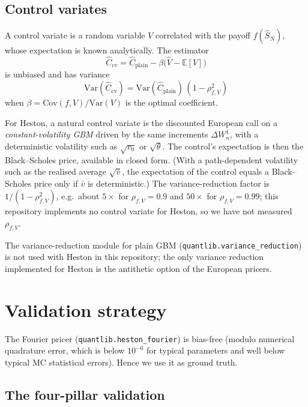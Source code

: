 \documentclass[11pt]{article}
\theoremstyle{plain}
\theoremstyle{definition}
\theoremstyle{remark}
\begin{document}
\subsection{Control variates}

A control variate is a random variable $V$ correlated with the payoff $f(\hat S_N)$, whose expectation is known analytically. The estimator
\[
    \widehat C_{\mathrm{cv}} = \widehat C_{\mathrm{plain}} - \beta\bigl(\widehat V - \mathbb{E}[V]\bigr)
\]
is unbiased and has variance
\[
    \mathrm{Var}(\widehat C_{\mathrm{cv}}) = \mathrm{Var}(\widehat C_{\mathrm{plain}})\,(1 - \rho^2_{f, V})
\]
when $\beta = \mathrm{Cov}(f, V)/\mathrm{Var}(V)$ is the optimal coefficient.

For Heston, a natural control variate is the discounted European call on a \emph{constant-volatility GBM} driven by the same increments $\Delta W^1_n$, with a deterministic volatility such as $\sqrt{v_0}$ or $\sqrt{\theta}$. The control's expectation is then the Black--Scholes price, available in closed form. (With a path-dependent volatility such as the realised average $\sqrt{\bar v}$, the expectation of the control equals a Black--Scholes price only if $\bar v$ is deterministic.) The variance-reduction factor is $1/(1 - \rho^2_{f, V})$, e.g.\ about $5\times$ for $\rho_{f,V} = 0.9$ and $50\times$ for $\rho_{f,V} = 0.99$; this repository implements no control variate for Heston, so we have not measured $\rho_{f,V}$.

The variance-reduction module for plain GBM (\texttt{quantlib.variance\_reduction}) is not used with Heston in this repository; the only variance reduction implemented for Heston is the antithetic option of the European pricers.

\section{Validation strategy}

The Fourier pricer (\texttt{quantlib.heston\_fourier}) is bias-free (modulo numerical quadrature error, which is below $10^{-6}$ for typical parameters and well below typical MC statistical errors). Hence we use it as ground truth.

\subsection{The four-pillar validation}
\end{document}
